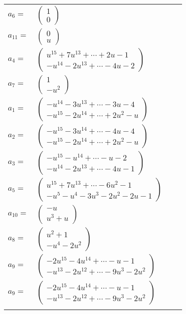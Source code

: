 \documentclass[1p]{elsarticle_modified}
\theoremstyle{definition}
\begin{document}
\begin{tabular}{m{7pt} m{180pt} m{7pt} m{180pt} }
\flushright $a_{6}=$&$\begin{pmatrix}1\\0\end{pmatrix}$ \\
\flushright $a_{11}=$&$\begin{pmatrix}0\\u\end{pmatrix}$ \\
\flushright $a_{4}=$&$\begin{pmatrix}u^{15}+7 u^{13}+\cdots+2 u-1\\- u^{14}-2 u^{13}+\cdots-4 u-2\end{pmatrix}$ \\
\flushright $a_{7}=$&$\begin{pmatrix}1\\- u^2\end{pmatrix}$ \\
\flushright $a_{1}=$&$\begin{pmatrix}- u^{14}-3 u^{13}+\cdots-3 u-4\\- u^{15}-2 u^{14}+\cdots+2 u^2- u\end{pmatrix}$ \\
\flushright $a_{2}=$&$\begin{pmatrix}- u^{15}-3 u^{14}+\cdots-4 u-4\\- u^{15}-2 u^{14}+\cdots+2 u^2- u\end{pmatrix}$ \\
\flushright $a_{3}=$&$\begin{pmatrix}- u^{15}- u^{14}+\cdots- u-2\\- u^{14}-2 u^{13}+\cdots-4 u-1\end{pmatrix}$ \\
\flushright $a_{5}=$&$\begin{pmatrix}u^{15}+7 u^{13}+\cdots-6 u^2-1\\- u^5- u^4-3 u^3-2 u^2-2 u-1\end{pmatrix}$ \\
\flushright $a_{10}=$&$\begin{pmatrix}- u\\u^3+u\end{pmatrix}$ \\
\flushright $a_{8}=$&$\begin{pmatrix}u^2+1\\- u^4-2 u^2\end{pmatrix}$ \\
\flushright $a_{9}=$&$\begin{pmatrix}-2 u^{15}-4 u^{14}+\cdots- u-1\\- u^{13}-2 u^{12}+\cdots-9 u^3-2 u^2\end{pmatrix}$\\ \flushright $a_{9}=$&$\begin{pmatrix}-2 u^{15}-4 u^{14}+\cdots- u-1\\- u^{13}-2 u^{12}+\cdots-9 u^3-2 u^2\end{pmatrix}$\\&\end{tabular}
\end{document}
